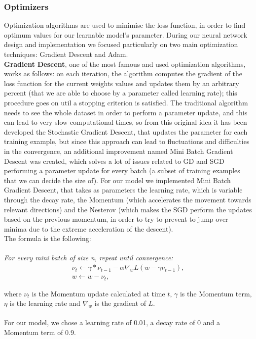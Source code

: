 \documentclass[12pt]{article}
\begin{document}
\subsubsection{Optimizers}
Optimization algorithms are used to minimise the loss function, in order to find optimum values for our learnable model’s parameter. During our neural network design and implementation we focused particularly on two main optimization techniques: Gradient Descent and Adam. \\
\textbf{Gradient Descent}, one of the most famous and used optimization algorithms, works as follows: on each iteration, the algorithm computes the gradient of the loss function for the current weights values and updates them by an arbitrary percent (that we are able to choose by a parameter called learning rate); this procedure goes on util a stopping criterion is satisfied. 
The traditional algorithm needs to see the whole dataset in order to perform a parameter update, and this can lead to very slow computational times, so from this original idea it has been developed the Stochastic Gradient Descent, that updates the parameter for each training example, but since this approach can lead to fluctuations and difficulties in the convergence, an additional improvement named Mini Batch Gradient Descent was created, which solves a lot of issues related to GD and SGD performing a parameter update for every batch (a subset of training examples that we can decide the size of). 
For our model we implemented Mini Batch Gradient Descent, that takes as parameters the learning rate, which is variable through the decay rate, the Momentum (which accelerates the movement towards relevant directions) and the Nesterov (which makes the SGD perform the updates based on the previous momentum, in order to try to prevent to jump over minima due to the extreme acceleration of the descent).  \\
The formula is the following: \\ \\

\textit{For every mini batch of size n, repeat until convergence:} \\
\begin{align*}
\nu_{t}  \gets \gamma  *  \nu_{t-1} - \alpha \nabla_{w} L(w - \gamma\nu_{t-1}), \\
w \gets  w - \nu_{t},
\end{align*}


where $\nu_{t}$ is the Momentum update calculated at time $t$, $\gamma$ is the Momentum term, $\eta$ is the learning rate and $\nabla_{w}$ is the gradient of $L$.   \\ \\
For our model, we chose a learning rate of 0.01, a decay rate of 0 and a Momentum term of 0.9. \\
\end{document}
